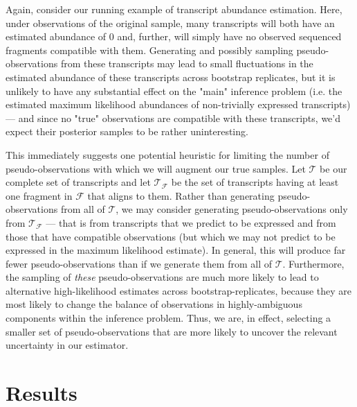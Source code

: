 Again, consider our running example of transcript abundance estimation. Here, under observations 
of the original sample, many transcripts will both have an estimated abundance of 0 and, further, 
will simply have no observed sequenced fragments compatible with them.  Generating and possibly 
sampling pseudo-observations from these transcripts may lead to small fluctuations in the estimated 
abundance of these transcripts across bootstrap replicates, but it is unlikely to have any 
substantial effect on the "main" inference problem (i.e. the estimated maximum likelihood 
abundances of non-trivially expressed transcripts) — and since no "true" observations are 
compatible with these transcripts, we'd expect their posterior samples to be rather uninteresting.

This immediately suggests one potential heuristic for limiting the number of pseudo-observations 
with which we will augment our true samples. Let $\mathcal{T}$ be our complete set of transcripts 
and let $\mathcal{T}_\mathcal{F}$ be the set of transcripts having at least one fragment in 
$\mathcal{F}$ that aligns to them. Rather than generating pseudo-observations from all of 
$\mathcal{T}$, we may consider generating pseudo-observations only from 
$\mathcal{T}_\mathcal{F}$ — that is from transcripts that we predict to be expressed and from those 
that have compatible observations (but which we may not predict to be expressed in the maximum 
likelihood estimate). In general, this will produce far fewer pseudo-observations than if we 
generate them from all of $\mathcal{T}$. Furthermore, the sampling of \textit{these} 
pseudo-observations are much more likely to lead to alternative high-likelihood estimates across 
bootstrap-replicates, because they are most likely to change the balance of observations in 
highly-ambiguous components within the inference problem. Thus, we are, in effect, selecting a 
smaller set of pseudo-observations that are more likely to uncover the relevant uncertainty 
in our estimator.




\section{Results}

